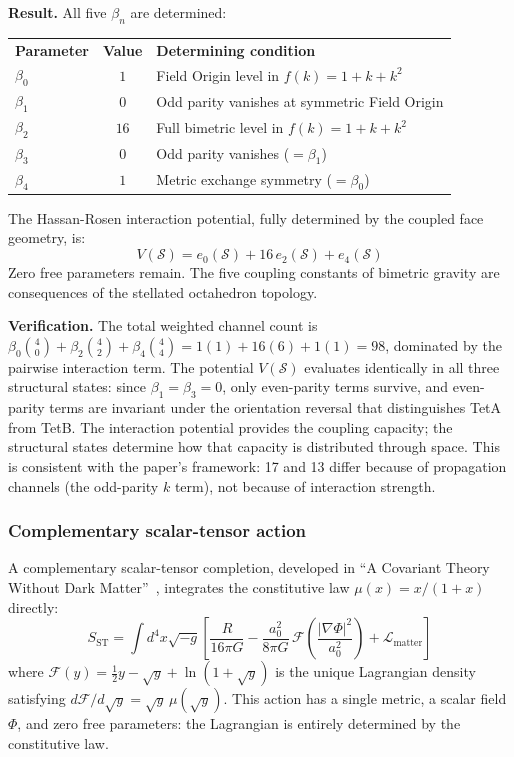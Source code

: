 \documentclass[aps,prd,preprint,superscriptaddress,showpacs,preprintnumbers,amsmath,amssymb,nofootinbib]{revtex4-2}
\begin{document}
\textbf{Result.} All five $\beta_n$ are determined:
\begin{center}
\renewcommand{\arraystretch}{1.3}
\begin{tabular}{@{}lcl@{}}
\textbf{Parameter} & \textbf{Value} & \textbf{Determining condition} \\[2pt]
$\beta_0$ & $1$ & Field Origin level in $f(k) = 1 + k + k^2$ \\
$\beta_1$ & $0$ & Odd parity vanishes at symmetric Field Origin \\
$\beta_2$ & $16$ & Full bimetric level in $f(k) = 1 + k + k^2$ \\
$\beta_3$ & $0$ & Odd parity vanishes ($ = \beta_1$) \\
$\beta_4$ & $1$ & Metric exchange symmetry ($ = \beta_0$) \\
\end{tabular}
\end{center}
The Hassan-Rosen interaction potential, fully determined by the coupled face geometry, is:
\begin{equation}
V(\mathcal{S}) = e_0(\mathcal{S}) + 16\,e_2(\mathcal{S}) + e_4(\mathcal{S})
\label{eq:V-determined}
\end{equation}
Zero free parameters remain. The five coupling constants of bimetric gravity are consequences of the stellated octahedron topology.

\textbf{Verification.} The total weighted channel count is $\beta_0\binom{4}{0} + \beta_2\binom{4}{2} + \beta_4\binom{4}{4} = 1(1) + 16(6) + 1(1) = 98$, dominated by the pairwise interaction term. The potential $V(\mathcal{S})$ evaluates identically in all three structural states: since $\beta_1 = \beta_3 = 0$, only even-parity terms survive, and even-parity terms are invariant under the orientation reversal that distinguishes TetA from TetB. The interaction potential provides the coupling capacity; the structural states determine how that capacity is distributed through space. This is consistent with the paper's framework: 17 and 13 differ because of propagation channels (the odd-parity $k$ term), not because of interaction strength.

\subsubsection*{Complementary scalar-tensor action}

A complementary scalar-tensor completion, developed in ``A Covariant Theory Without Dark Matter''~\cite{paper2}, integrates the constitutive law $\mu(x) = x/(1+x)$ directly:
\begin{equation}
S_{\text{ST}} = \int d^4x \sqrt{-g} \left[ \frac{R}{16\pi G} - \frac{a_0^2}{8\pi G}\,\mathcal{F}\!\left(\frac{|\nabla\Phi|^2}{a_0^2}\right) + \mathcal{L}_{\text{matter}} \right]
\label{eq:scalar-tensor}
\end{equation}
where $\mathcal{F}(y) = \tfrac{1}{2}y - \sqrt{y} + \ln(1 + \sqrt{y})$ is the unique Lagrangian density satisfying $d\mathcal{F}/d\sqrt{y} = \sqrt{y}\,\mu(\sqrt{y})$. This action has a single metric, a scalar field $\Phi$, and zero free parameters: the Lagrangian is entirely determined by the constitutive law.
\end{document}
